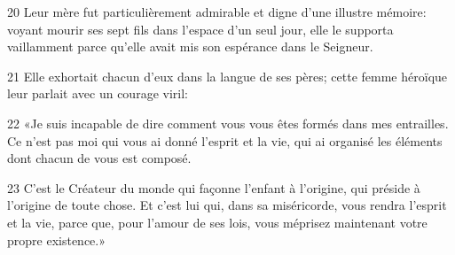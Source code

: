 20 Leur mère fut particulièrement admirable et digne d’une illustre mémoire: voyant mourir ses sept fils dans l’espace d’un seul jour, elle le supporta vaillamment parce qu’elle avait mis son espérance dans le Seigneur.

21 Elle exhortait chacun d’eux dans la langue de ses pères; cette femme héroïque leur parlait avec un courage viril:

22 «Je suis incapable de dire comment vous vous êtes formés dans mes entrailles. Ce n’est pas moi qui vous ai donné l’esprit et la vie, qui ai organisé les éléments dont chacun de vous est composé.

23 C’est le Créateur du monde qui façonne l’enfant à l’origine, qui préside à l’origine de toute chose. Et c’est lui qui, dans sa miséricorde, vous rendra l’esprit et la vie, parce que, pour l’amour de ses lois, vous méprisez maintenant votre propre existence.»